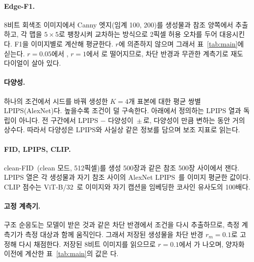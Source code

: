 \documentclass[10pt,twocolumn,a4paper]{article}
\begin{document}
\paragraph{Edge-F1.} 8비트 회색조 이미지에서 Canny 엣지(임계 100, 200)를 생성물과 참조
양쪽에서 추출하고, 각 맵을 $5{\times}5$로 팽창시켜 교차하는 방식으로 2픽셀 허용 오차를 두어
대응시킨다. F1을 이미지별로 계산해 평균한다. $r$에 의존하지 않으며 그래서
표~\ref{tab:main}에 싣는다. $r{=}0.05$에서 \edgeMainZeroFive{}, $r{=}1$에서
\edgeMainOneHundred{}로 떨어지므로, 차단 반경과 무관한 계측기로 재도 다이얼이 살아 있다.

\paragraph{다양성.} 하나의 조건에서 시드를 바꿔 생성한 $K{=}4$개 표본에 대한 평균 쌍별
LPIPS(AlexNet)다. 높을수록 조건이 덜 구속한다. 아래에서 정의하는 LPIPS 열과 독립이 아니다.
전 구간에서 LPIPS $-$ 다양성이 \divGap{}\,$\pm$\,\divGapSd{}로, 다양성이 \divRange{}만큼
변하는 동안 거의 상수다. 따라서 다양성은 LPIPS와 사실상 같은 정보를 담으며 보조 지표로
읽는다.

\paragraph{FID, LPIPS, CLIP.} clean-FID~\cite{heusel2017gans,parmar2021aliased}(clean
모드, 512픽셀)를 생성 500장과 같은 참조 500장 사이에서 잰다. LPIPS 열은 각 생성물과 자기
참조 사이의 AlexNet LPIPS~\cite{zhang2018unreasonable}를 이미지 평균한 값이다. CLIP 점수는
ViT-B/32~\cite{radford2021learning}로 이미지와 자기 캡션을 임베딩한 코사인 유사도의
100배다.

\paragraph{고정 계측기.}\label{sec:fixedinst}
구조 순응도는 모델이 받은 것과 같은 차단 반경에서 조건을 다시 추출하므로, 측정 계측기가
측정 대상과 함께 움직인다. 그래서 저장된 생성물을 차단 반경 $r_m{=}0.1$로 고정해 다시
채점한다. 저장된 8비트 이미지를 읽으므로 $r{=}0.1$에서 \fixInstOneZero{}가 나오며,
양자화 이전에 계산한 표~\ref{tab:main}의 값은 \scMainOneZero{}다.
\end{document}

